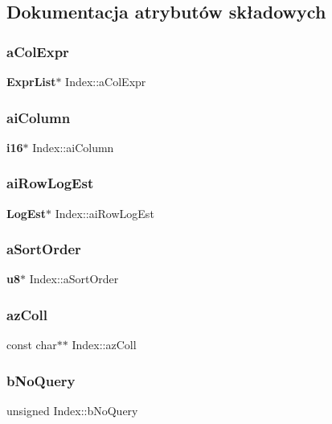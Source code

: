 \subsection{Dokumentacja atrybutów składowych}
\mbox{\label{struct_index_ad56e9619762ce33f1a9cd96affc0d3d4}} 
\subsubsection{aColExpr}
{\footnotesize\ttfamily \textbf{ Expr\+List}$\ast$ Index\+::a\+Col\+Expr}

\mbox{\label{struct_index_a62b5bf88f7c567f15e9a8c9da579d45c}} 
\subsubsection{aiColumn}
{\footnotesize\ttfamily \textbf{ i16}$\ast$ Index\+::ai\+Column}

\mbox{\label{struct_index_a830ea536e93022501262afe908bdd35c}} 
\subsubsection{aiRowLogEst}
{\footnotesize\ttfamily \textbf{ Log\+Est}$\ast$ Index\+::ai\+Row\+Log\+Est}

\mbox{\label{struct_index_a0a3fc87b53193995f59c9657443e9a99}} 
\subsubsection{aSortOrder}
{\footnotesize\ttfamily \textbf{ u8}$\ast$ Index\+::a\+Sort\+Order}

\mbox{\label{struct_index_a04f01be3e98aabc4a0516a2fbf28fae1}} 
\subsubsection{azColl}
{\footnotesize\ttfamily const char$\ast$$\ast$ Index\+::az\+Coll}

\mbox{\label{struct_index_a3caadc51fa09f6120d19b3250939b3c3}} 
\subsubsection{bNoQuery}
{\footnotesize\ttfamily unsigned Index\+::b\+No\+Query}


